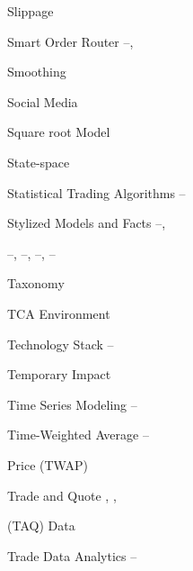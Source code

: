 \begin{multicols}{2}
{Slippage \hfill \pageref{in:slippage} \par

Smart Order Router \hfill \pageref{in:sor1}--\pageref{in:sor2}, \pageref{in:sor3} \par

Smoothing \hfill \pageref{in:smoothing} \par

Social Media \hfill \pageref{in:social} \par

Square root Model \hfill \pageref{in:sqmodel} \par

State-space \hfill \pageref{in:state_space} \par

Statistical Trading Algorithms \hfill \pageref{in:sta1}--\pageref{in:sta2} \par

Stylized Models and Facts \hfill \pageref{in:style1}--\pageref{in:style2}, \par \hfill \pageref{in:style3}--\pageref{in:style4}, \pageref{in:style5}--\pageref{in:style6}, \pageref{in:style7}--\pageref{in:style8}, \pageref{in:style9}--\pageref{in:style10} \par

Taxonomy \hfill \pageref{in:taxonomy} \par

TCA Environment \hfill \pageref{in:tca_environ} \par

Technology Stack \hfill \pageref{in:tech_stack1}--\pageref{in:tech_stack2} \par

Temporary Impact \hfill \pageref{in:tempimpact} \par

Time Series Modeling \hfill \pageref{in:tsm1}--\pageref{in:tsm2} \par

Time-Weighted Average \hfill \pageref{in:twap1}--\pageref{in:twap2} \par \hspace{0.25cm} Price (TWAP) \par

Trade and Quote \hfill \pageref{in:taq1}, \pageref{in:taq2}, \pageref{in:taq3} \par \hspace{0.25cm} (TAQ) Data \par

Trade Data Analytics \hfill \pageref{in:tda1}--\pageref{in:tda2} \par

}
\end{multicols}
